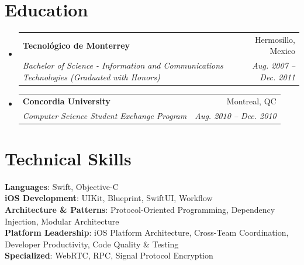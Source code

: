 \documentclass[letterpaper,11pt]{article}
\makeatletter
\newcommand{\resumeSubheading}[4]{
  \vspace{-2pt}\item
    \begin{tabular*}{0.97\textwidth}[t]{l@{\extracolsep{\fill}}r}
      \textbf{#1} & #2 \\
      \textit{\small#3} & \textit{\small #4} \\
    \end{tabular*}\vspace{-7pt}
}
\newcommand{\resumeSubHeadingListStart}{\begin{itemize}[leftmargin=0.15in, label={}]}
\newcommand{\resumeSubHeadingListEnd}{\end{itemize}}
\makeatother
\begin{document}
\section{Education}
  \resumeSubHeadingListStart
    \resumeSubheading
      {Tecnológico de Monterrey}{Hermosillo, Mexico}
      {Bachelor of Science - Information and Communications Technologies (Graduated with Honors)}{Aug. 2007 -- Dec. 2011}
    \resumeSubheading
      {Concordia University}{Montreal, QC}
      {Computer Science Student Exchange Program}{Aug. 2010 -- Dec. 2010}
  \resumeSubHeadingListEnd


\section{Technical Skills}
 \begin{itemize}[leftmargin=0.15in, label={}]
    \small{\item{
     \textbf{Languages}{: Swift, Objective-C} \\
     \textbf{iOS Development}{: UIKit, Blueprint, SwiftUI, Workflow} \\
     \textbf{Architecture \& Patterns}{: Protocol-Oriented Programming, Dependency Injection, Modular Architecture} \\
     \textbf{Platform Leadership}{: iOS Platform Architecture, Cross-Team Coordination, Developer Productivity, Code Quality \& Testing} \\
     \textbf{Specialized}{: WebRTC, RPC, Signal Protocol Encryption} \\
    }}
 \end{itemize}


\end{document}
